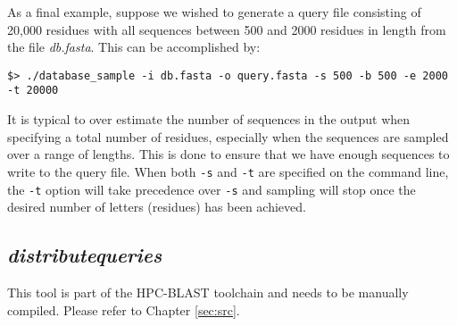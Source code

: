 \documentclass[10pt]{article}
\begin{document}
\noindent As a final example, suppose we wished to generate a query file consisting of 20,000 residues with all sequences between 500 and 2000 residues in length from the file \emph{db.fasta}.  This can be accomplished by:
\begin{verbatim}
$> ./database_sample -i db.fasta -o query.fasta -s 500 -b 500 -e 2000 -t 20000
\end{verbatim}
\noindent It is typical to over estimate the number of sequences in the output when specifying a total number of residues, especially when the sequences are sampled over a range of lengths.  This is done to ensure that we have enough sequences
to write to the query file.  When both \verb^-s^ and \verb^-t^ are specified on the command line, the \verb^-t^ option will take precedence over \verb^-s^ and sampling will stop once the desired number of letters (residues) has been achieved.

\subsection{\emph{distribute\textunderscore queries}} \label{ssec:distqueries}

 This tool is part of the HPC-BLAST toolchain and needs to be manually compiled.  Please refer to Chapter \ref{sec:src}.\\
\end{document}
